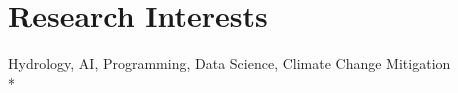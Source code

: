 \section{Research Interests}
Hydrology, AI, Programming, Data Science, Climate Change Mitigation
\\*

\vspace{-1.5em}
